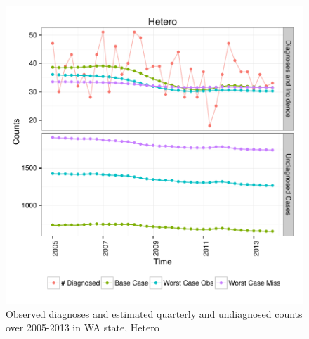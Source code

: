 \documentclass{article}\usepackage[]{graphicx}\usepackage[]{color}
\makeatletter
\def\maxwidth{ %
  \ifdim\Gin@nat@width>\linewidth
    \linewidth
  \else
    \Gin@nat@width
  \fi
}
\newenvironment{knitrout}{}{} %
\makeatother
\begin{document}
\begin{knitrout}\footnotesize
{}\color{fgcolor}\begin{figure}[]


{\centering \includegraphics[width=\maxwidth]{figure/minimal-plot_subgroup_Hetero} 

}

\caption[Observed diagnoses and estimated quarterly and undiagnosed counts over 2005-2013 in WA state, Hetero]{Observed diagnoses and estimated quarterly and undiagnosed counts over 2005-2013 in WA state, Hetero\label{fig:plot_subgroup_Hetero}}
\end{figure}


\end{knitrout}
\end{document}
